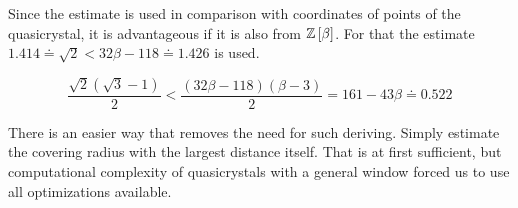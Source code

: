 \documentclass[text.tex]{subfiles}
\begin{document}
Since the estimate is used in comparison with coordinates of points of the quasicrystal, it is advantageous if it is also from $\mathbb{Z}\left[\beta\right]$. For that the estimate $1.414 \doteq \sqrt{2} <32\beta-118 \doteq 1.426$ is used.

$$\frac{\sqrt{2}(\sqrt{3}-1)}{2} < \frac{(32\beta-118)(\beta-3)}{2} = 161-43\beta \doteq 0.522$$







\begin{remark}
There is an easier way that removes the need for such deriving. Simply estimate the covering radius with the largest distance itself. That is at first sufficient, but computational complexity of quasicrystals with a general window forced us to use all optimizations available.
\end{remark}
\end{document}
